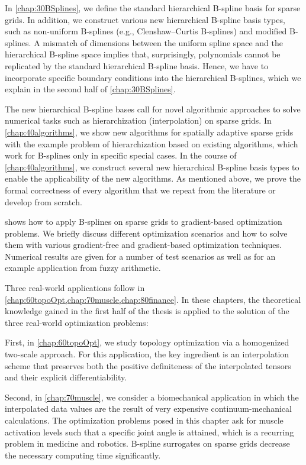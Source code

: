 In \cref{chap:30BSplines}, we define
the standard hierarchical B-spline basis for sparse grids.
In addition, we construct various new hierarchical
B-spline basis types, such as
non-uniform B-splines (e.g., Clenshaw--Curtis B-splines) and
modified B-splines.
A mismatch of dimensions between the uniform spline space and the
hierarchical B-spline space implies that, surprisingly,
polynomials cannot be replicated by the
standard hierarchical B-spline basis.
Hence, we have to incorporate specific boundary conditions
 into the hierarchical B-splines,
which we explain in the second half of \cref{chap:30BSplines}.

The new hierarchical B-spline bases call for novel algorithmic approaches
to solve numerical tasks such as
hierarchization (interpolation) on sparse grids.
In \cref{chap:40algorithms}, we show new algorithms for
spatially adaptive sparse grids with the example problem of hierarchization
based on existing algorithms,
which work for B-splines only in specific special cases.
In the course of \cref{chap:40algorithms}, we construct several new
hierarchical B-spline basis types to enable the
applicability of the new algorithms.
As mentioned above, we prove the formal correctness of every algorithm
that we repeat from the literature or develop from scratch.

 shows how to apply B-splines on sparse grids
to gradient-based optimization problems.
We briefly discuss different optimization scenarios and how to solve them
with various gradient-free and gradient-based optimization techniques.
Numerical results are given for a number of test scenarios as well
as for an example application from fuzzy arithmetic.

Three real-world applications follow in
\cref{chap:60topoOpt,chap:70muscle,chap:80finance}.
In these chapters,
the theoretical knowledge gained in the first half of the thesis
is applied to the solution of the three real-world optimization problems:

First, in \cref{chap:60topoOpt},
we study topology optimization via a homogenized two-scale approach.
For this application, the key ingredient is an interpolation scheme
that preserves both the positive definiteness of the interpolated tensors and
their explicit differentiability.

Second, in \cref{chap:70muscle},
we consider a biomechanical application in which the interpolated data values
are the result of very expensive continuum-mechanical calculations.
The optimization problems posed in this chapter ask for
muscle activation levels such that a specific joint angle is attained,
which is a recurring problem in medicine and robotics.
B-spline surrogates on sparse grids
decrease the necessary computing time significantly.

